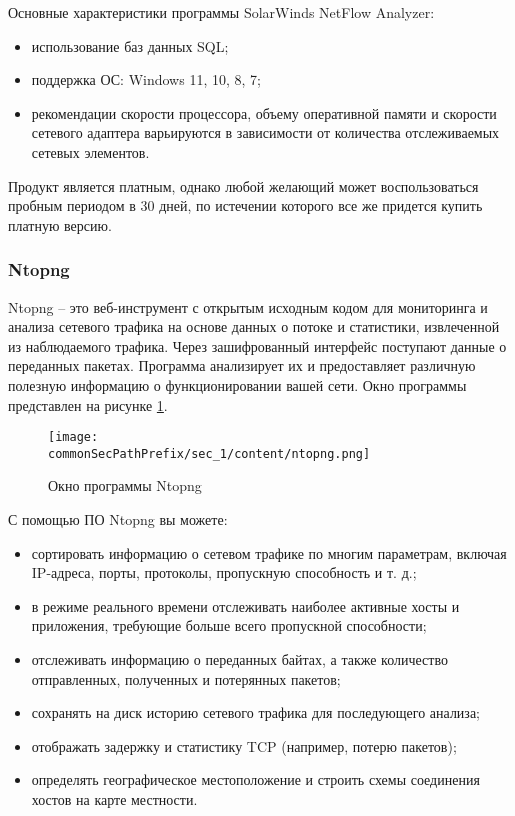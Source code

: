 Основные характеристики программы SolarWinds NetFlow Analyzer:
\begin{itemize}
    \item использование баз данных SQL;
    \item поддержка ОС: Windows 11, 10, 8, 7;
    \item рекомендации скорости процессора, объему оперативной памяти и
    скорости сетевого адаптера варьируются в зависимости от количества
    отслеживаемых сетевых элементов.
\end{itemize}

Продукт является платным, однако любой желающий может воспользоваться пробным 
периодом в 30 дней, по истечении которого все же придется купить платную версию.


\subsubsection{Ntopng}

Ntopng -- это веб-инструмент с открытым исходным кодом для
мониторинга и анализа сетевого трафика на основе данных о потоке и
статистики, извлеченной из наблюдаемого трафика. Через зашифрованный
интерфейс поступают данные о переданных пакетах. Программа анализирует их
и предоставляет различную полезную информацию о функционировании вашей
сети. Окно программы представлен на рисунке \ref{fig:ntopng}.

\begin{figure}[h!]
    \centering
    \texttt{[image: \\commonSecPathPrefix/sec\_1/content/ntopng.png]}
    \caption{Окно программы Ntopng}
    \label{fig:ntopng}
\end{figure}

С помощью ПО Ntopng вы можете:
\begin{itemize}
    \item сортировать информацию о сетевом трафике по многим параметрам,
    включая IP-адреса, порты, протоколы, пропускную способность и т. д.;
    \item в режиме реального времени отслеживать наиболее активные хосты и
    приложения, требующие больше всего пропускной способности;
    \item отслеживать информацию о переданных байтах, а также количество
    отправленных, полученных и потерянных пакетов;
    \item сохранять на диск историю сетевого трафика для последующего анализа;
    \item отображать задержку и статистику TCP (например, потерю пакетов);
    \item определять географическое местоположение и строить схемы соединения
    хостов на карте местности.
\end{itemize}


